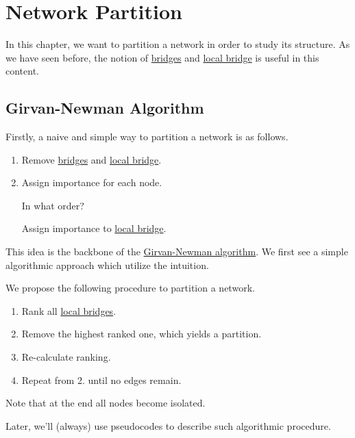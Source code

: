 \chapter{Network Partition}
In this chapter, we want to partition a network in order to study its structure. As we have seen before, the
notion of \hyperref[def:bridge]{bridges} and \hyperref[def:local-bridge]{local bridge} is useful in this content.

\section{Girvan-Newman Algorithm}
Firstly, a naive and simple way to partition a network is as follows.
\begin{enumerate}
	\item Remove \hyperref[def:bridge]{bridges} and \hyperref[def:local-bridge]{local bridge}.
	\item Assign importance for each node.
	      \begin{problem}
	      In what order?
	      \end{problem}
	      \begin{answer}
		      Assign importance to \hyperref[def:local-bridge]{local bridge}.
	      \end{answer}
\end{enumerate}

This idea is the backbone of the \hyperref[algo:Girvan-Newman-algorithm]{Girvan-Newman algorithm}. We first see a simple algorithmic
approach which utilize the intuition.
\begin{remark}
	We propose the following procedure to partition a network.
	\begin{enumerate}
		\item Rank all \hyperref[def:local-bridge]{local bridges}.
		\item Remove the highest ranked one, which yields a partition.
		\item Re-calculate ranking.
		\item Repeat from 2. until no edges remain.
	\end{enumerate}
	Note that at the end all nodes become isolated.
\end{remark}

\begin{note}
	Later, we'll (always) use pseudocodes to describe such algorithmic procedure.
\end{note}


